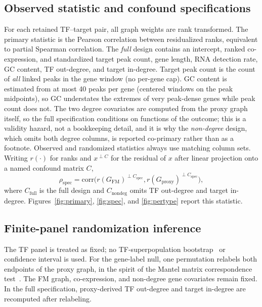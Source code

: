 \documentclass[fleqn,10pt,lineno]{wlpeerj}
\begin{document}
\subsection{Observed statistic and confound specifications}\label{sec:statistic}
For each retained TF--target pair, all graph weights are rank transformed. The primary statistic is
the Pearson correlation between residualized ranks, equivalent to partial Spearman correlation. The
\emph{full} design contains an intercept, ranked co-expression, and standardized target peak count,
gene length, RNA detection rate, GC content, TF out-degree, and target in-degree. Target peak count
is the count of \emph{all} linked peaks in the gene window (no per-gene cap). GC content is estimated
from at most 40 peaks per gene (centered windows on the peak midpoints), so GC understates the
extremes of very peak-dense genes while peak count does not. The two degree
covariates are computed from the proxy graph itself, so the full specification conditions on
functions of the outcome; this is a validity hazard, not a bookkeeping detail, and it is why the
\emph{non-degree} design, which omits both degree columns, is reported co-primary rather than as a
footnote. Observed and randomized statistics always use matching column sets.
Writing $r(\cdot)$ for ranks and $x^{\perp C}$ for the residual of $x$ after linear projection onto a named confound matrix $C$,
\begin{equation}
\label{eq:partial-rho}
\rho_{\mathrm{spec}}
=
\mathrm{corr}\bigl(r(G_{\mathrm{FM}})^{\perp C_{\mathrm{spec}}},
r(G_{\mathrm{proxy}})^{\perp C_{\mathrm{spec}}}\bigr),
\end{equation}
where $C_{\mathrm{full}}$ is the full design and $C_{\mathrm{nondeg}}$ omits TF out-degree and target in-degree.
Figures~\ref{fig:primary}, \ref{fig:spec}, and \ref{fig:pertype} report this statistic.

\subsection{Finite-panel randomization inference}\label{sec:inference}
The TF panel is treated as fixed; no TF-superpopulation bootstrap~\citep{efron1993bootstrap} or
confidence interval is used. For
the gene-label null, one permutation relabels both endpoints of the proxy graph, in the spirit of the
Mantel matrix correspondence test~\citep{mantel1967}. The FM graph,
co-expression, and non-degree gene covariates remain fixed. In the full specification, proxy-derived
TF out-degree and target in-degree are recomputed after relabeling.
\end{document}
